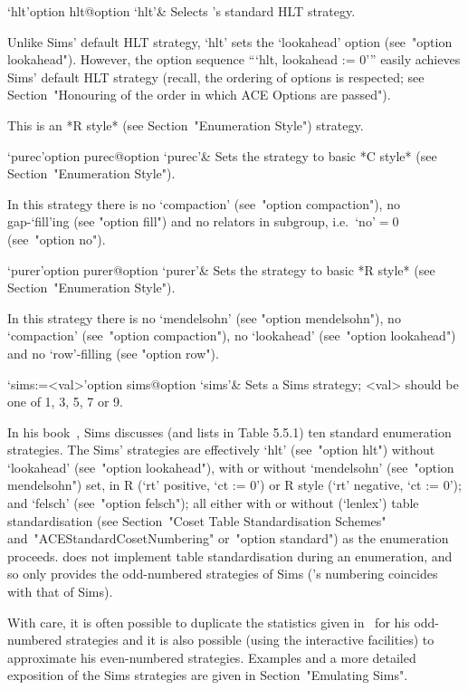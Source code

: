 \>`hlt'{option hlt}@{option `hlt'}&
Selects  {\ACE}'s   standard   HLT   strategy.   

Unlike  Sims'  \cite{Sim94}  default  HLT  strategy,  `hlt'  sets  the
`lookahead'  option  (see~"option  lookahead").  However,  the  option
sequence ```hlt, lookahead := 0''' easily achieves Sims'  default  HLT
strategy  (recall,  the  ordering  of  options   is   respected;   see
Section~"Honouring of the order in which ACE Options are passed").

This is an *R style* (see Section~"Enumeration Style") strategy.

\>`purec'{option purec}@{option `purec'}&
Sets the strategy to basic *C style* (see Section~"Enumeration  Style").

In this strategy there is no `compaction'  (see~"option  compaction"),
no gap-`fill'ing (see "option fill")  and  no  relators  in  subgroup,
i.e.~`no'${}=0$ (see~"option no").

\>`purer'{option purer}@{option `purer'}&
Sets the strategy  to basic *R style* (see Section~"Enumeration  Style").

In this strategy there is no `mendelsohn' (see  "option  mendelsohn"),
no `compaction' (see~"option compaction"), no `lookahead' (see~"option
lookahead") and no `row'-filling (see "option row").

\>`sims:=<val>'{option sims}@{option `sims'}&
Sets a Sims strategy; <val> should be one of 1, 3, 5, 7 or 9.

In his book~\cite{Sim94}, Sims discusses (and lists  in  Table  5.5.1)
ten  standard  enumeration  strategies.  The  Sims'   strategies   are
effectively `hlt' (see~"option hlt") without `lookahead'  (see~"option
lookahead"), with or without  `mendelsohn'  (see~"option  mendelsohn")
set, in R (`rt' positive, `ct := 0') or R\* style (`rt' negative,  `ct
:= 0'); and `felsch' (see~"option felsch"); all either with or without
(`lenlex')   table   standardisation   (see    Section~"Coset    Table
Standardisation  Schemes"  and~"ACEStandardCosetNumbering"  or~"option
standard") as the enumeration  proceeds.  {\ACE}  does  not  implement
table standardisation during an enumeration, and so only provides  the
odd-numbered strategies of Sims  ({\ACE}'s  numbering  coincides  with
that of Sims).

With care, it is often possible  to  duplicate  the  statistics  given
in~\cite{Sim94}  for  his  odd-numbered  strategies  and  it  is  also
possible  (using  the  interactive  facilities)  to  approximate   his
even-numbered strategies. Examples and a more detailed  exposition  of
the Sims strategies are given in Section~"Emulating Sims".

\enditems


